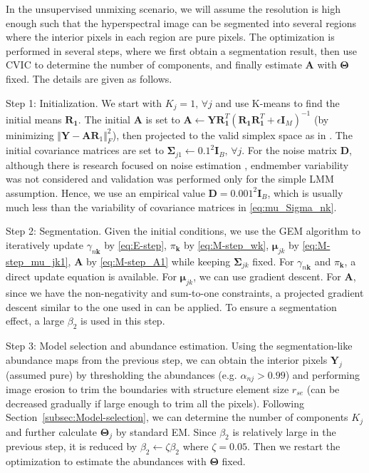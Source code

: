\documentclass[twocolumn,english]{IEEEtran}
\theoremstyle{plain}
\begin{document}
In the unsupervised unmixing scenario, we will assume the resolution
is high enough such that the hyperspectral image can be segmented
into several regions where the interior pixels in each region are
pure pixels. The optimization is performed in several steps, where
we first obtain a segmentation result, then use CVIC to determine
the number of components, and finally estimate $\mathbf{A}$ with
$\boldsymbol{\Theta}$ fixed. The details are given as follows.

Step 1: Initialization. We start with $K_{j}=1,\,\forall j$ and use
K-means to find the initial means $\mathbf{R}_{\mathbf{1}}$. The
initial $\mathbf{A}$ is set to $\mathbf{A}\leftarrow\mathbf{Y}\mathbf{R}_{\mathbf{1}}^{T}\left(\mathbf{R}_{\mathbf{1}}\mathbf{R}_{\mathbf{1}}^{T}+\epsilon\mathbf{I}_{M}\right)^{-1}$
(by minimizing $\Vert\mathbf{Y}-\mathbf{A}\mathbf{R}_{1}\Vert_{F}^{2}$),
then projected to the valid simplex space as in \cite{zhou2016spatial}.
The initial covariance matrices are set to $\boldsymbol{\Sigma}_{j1}\leftarrow0.1^{2}\mathbf{I}_{B},\,\forall j$.
For the noise matrix $\mathbf{D}$, although there is research focused
on noise estimation \cite{gao2013comparative,roger1996principal},
endmember variability was not considered and validation was performed
only for the simple LMM assumption. Hence, we use an empirical value
$\mathbf{D}=0.001^{2}\mathbf{I}_{B}$, which is usually much less
than the variability of covariance matrices in \eqref{eq:mu_Sigma_nk}.

Step 2: Segmentation. Given the initial conditions, we use the GEM
algorithm to iteratively update $\gamma_{n\mathbf{k}}$ by \eqref{eq:E-step},
$\pi_{\mathbf{k}}$ by \eqref{eq:M-step_wk}, $\boldsymbol{\mu}_{jk}$
by \eqref{eq:M-step_mu_jk1}, $\mathbf{A}$ by \eqref{eq:M-step_A1}
while keeping $\boldsymbol{\Sigma}_{jk}$ fixed. For $\gamma_{n\mathbf{k}}$
and $\pi_{\mathbf{k}}$, a direct update equation is available. For
$\boldsymbol{\mu}_{jk}$, we can use gradient descent. For $\mathbf{A}$,
since we have the non-negativity and sum-to-one constraints, a projected
gradient descent similar to the one used in \cite{zhou2016spatial}
can be applied. To ensure a segmentation effect, a large $\beta_{2}$
is used in this step.

Step 3: Model selection and abundance estimation. Using the segmentation-like
abundance maps from the previous step, we can obtain the interior
pixels $\mathbf{Y}_{j}$ (assumed pure) by thresholding the abundances
(e.g. $\alpha_{nj}>0.99$) and performing image erosion to trim the
boundaries with structure element size $r_{se}$ (can be decreased
gradually if large enough to trim all the pixels). Following Section~\ref{subsec:Model-selection},
we can determine the number of components $K_{j}$ and further calculate
$\boldsymbol{\Theta}_{j}$ by standard EM. Since $\beta_{2}$ is relatively
large in the previous step, it is reduced by $\beta_{2}\leftarrow\zeta\beta_{2}$
where $\zeta=0.05$. Then we restart the optimization to estimate
the abundances with $\boldsymbol{\Theta}$ fixed.
\end{document}
